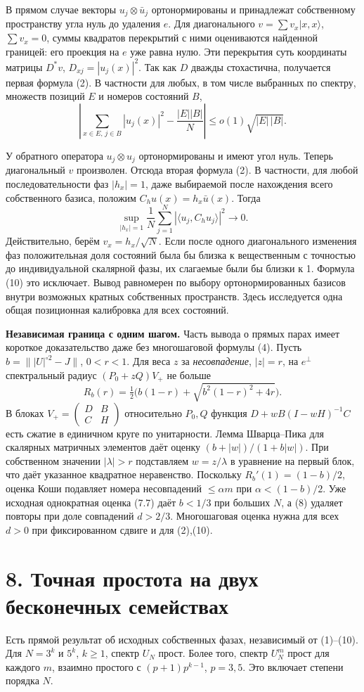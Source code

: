 \documentclass[11pt,a4paper]{article}
\newcommand{\C}{\mathbb C}
\newcommand{\sect}[1]{\section*{\sffamily\color{ink}#1}}
\begin{document}
В прямом случае векторы $u_j\otimes\bar u_j$ ортонормированы и принадлежат собственному пространству угла нуль до удаления $e$. Для диагонального $v=\sum v_x|x,x\rangle$, $\sum v_x=0$, суммы квадратов перекрытий с ними оцениваются найденной границей: его проекция на $e$ уже равна нулю. Эти перекрытия суть координаты матрицы $D^*v$, $D_{xj}=|u_j(x)|^2$. Так как $D$ дважды стохастична, получается первая формула (2). В частности для любых, в том числе выбранных по спектру, множеств позиций $E$ и номеров состояний $B$,
\[
 \left|\sum_{x\in E,\,j\in B}|u_j(x)|^2-\frac{|E||B|}{N}\right|
                         \le o(1)\sqrt{|E|\,|B|}.
\]

У обратного оператора $u_j\otimes u_j$ ортонормированы и имеют угол нуль. Теперь диагональный $v$ произволен. Отсюда вторая формула (2). В частности, для любой последовательности фаз $|h_x|=1$, даже выбираемой после нахождения всего собственного базиса, положим $C_h u(x)=h_x\bar u(x)$. Тогда
\[
             \sup_{|h_x|=1}\frac1N\sum_{j=1}^N
                     |\langle u_j,C_h u_j\rangle|^2\longrightarrow0.       \tag{10}
\]
Действительно, берём $v_x=h_x/\sqrt N$. Если после одного диагонального изменения фаз положительная доля состояний была бы близка к вещественным с точностью до индивидуальной скалярной фазы, их слагаемые были бы близки к 1. Формула (10) это исключает. Вывод равномерен по выбору ортонормированных базисов внутри возможных кратных собственных пространств. Здесь исследуется одна общая позиционная калибровка для всех состояний.

\textbf{Независимая граница с одним шагом.} Часть вывода о прямых парах имеет короткое доказательство даже без многошаговой формулы (4). Пусть $b=\||U|^{\circ2}-J\|$, $0<r<1$. Для веса $z$ за \emph{несовпадение}, $|z|=r$, на $e^\perp$ спектральный радиус $(P_0+zQ)V_+$ не больше
\[
            R_b(r)=\tfrac12\big(b(1-r)+\sqrt{b^2(1-r)^2+4r}\big).
\]
В блоках $V_+=\left(\begin{smallmatrix}D&B\\C&H\end{smallmatrix}\right)$ относительно $P_0,Q$ функция $D+wB(I-wH)^{-1}C$ есть сжатие в единичном круге по унитарности. Лемма Шварца--Пика для скалярных матричных элементов даёт оценку $(b+|w|)/(1+b|w|)$. При собственном значении $|\lambda|>r$ подставляем $w=z/\lambda$ в уравнение на первый блок, что даёт указанное квадратное неравенство. Поскольку $R_b'(1)=(1-b)/2$, оценка Коши подавляет номера несовпадений $\le\alpha m$ при $\alpha<(1-b)/2$. Уже исходная однократная оценка (7.7) даёт $b<1/3$ при больших $N$, а (8) удаляет повторы при доле совпадений $d>2/3$. Многошаговая оценка нужна для всех $d>0$ при фиксированном сдвиге и для (2),(10).
\newpage
\sect{8. Точная простота на двух бесконечных семействах}
Есть прямой результат об исходных собственных фазах, независимый от (1)--(10). Для $N=3^k$ и $5^k$, $k\ge1$, спектр $U_N$ прост. Более того, спектр $U_N^m$ прост для каждого $m$, взаимно простого с $(p+1)p^{k-1}$, $p=3,5$. Это включает степени порядка $N$.
\end{document}
